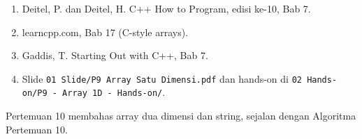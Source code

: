 \documentclass[a4paper]{article}
\begin{document}
\begin{enumerate}
\item Deitel, P. dan Deitel, H. C++ How to Program, edisi ke-10, Bab 7.
\item learncpp.com, Bab 17 (C-style arrays).
\item Gaddis, T. Starting Out with C++, Bab 7.
\item Slide \texttt{01 Slide/P9 Array Satu Dimensi.pdf} dan hands-on di \texttt{02 Hands-on/P9 - Array 1D - Hands-on/}.
\end{enumerate}
\begin{Penting}
Pertemuan 10 membahas array dua dimensi dan string, sejalan dengan Algoritma Pertemuan 10.
\end{Penting}
\end{document}
